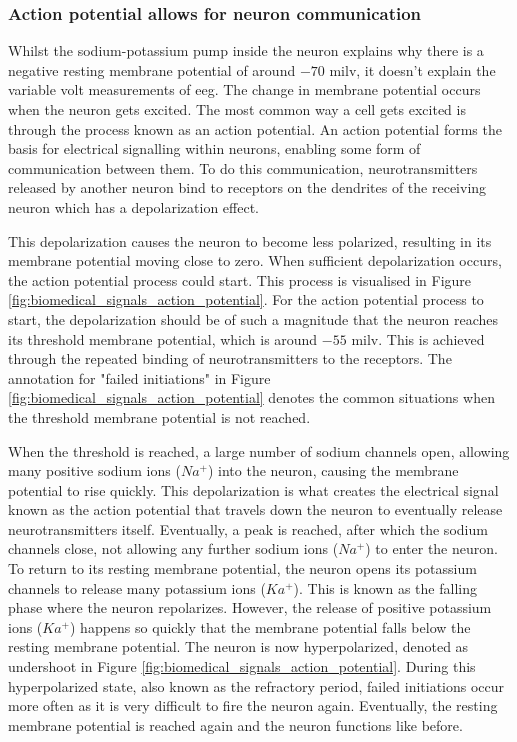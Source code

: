 \subsubsection{Action potential allows for neuron communication}
\label{subsubsec:biomedical_signals_biosignals_electrical_action_potential}

Whilst the sodium-potassium pump inside the neuron explains why there is a negative resting membrane potential of around $-70$ \gls{milv}, it doesn't explain the variable volt measurements of \gls{eeg}.
The change in membrane potential occurs when the neuron gets excited.
The most common way a cell gets excited is through the process known as an action potential.
An action potential forms the basis for electrical signalling within neurons, enabling some form of communication between them.
To do this communication, neurotransmitters released by another neuron bind to receptors on the dendrites of the receiving neuron which has a depolarization effect.

This depolarization causes the neuron to become less polarized, resulting in its membrane potential moving close to zero.
When sufficient depolarization occurs, the action potential process could start.
This process is visualised in Figure \ref{fig:biomedical_signals_action_potential}.
For the action potential process to start, the depolarization should be of such a magnitude that the neuron reaches its threshold membrane potential, which is around $-55$ \gls{milv}.
This is achieved through the repeated binding of neurotransmitters to the receptors.
The annotation for "failed initiations" in Figure \ref{fig:biomedical_signals_action_potential} denotes the common situations when the threshold membrane potential is not reached.

When the threshold is reached, a large number of sodium channels open, allowing many positive sodium ions ($Na^+$) into the neuron, causing the membrane potential to rise quickly.
This depolarization is what creates the electrical signal known as the action potential that travels down the neuron to eventually release neurotransmitters itself.
Eventually, a peak is reached, after which the sodium channels close, not allowing any further sodium ions ($Na^+$) to enter the neuron.
To return to its resting membrane potential, the neuron opens its potassium channels to release many potassium ions ($Ka^+$).
This is known as the falling phase where the neuron repolarizes.
However, the release of positive potassium ions ($Ka^+$) happens so quickly that the membrane potential falls below the resting membrane potential.
The neuron is now hyperpolarized, denoted as undershoot in Figure \ref{fig:biomedical_signals_action_potential}.
During this hyperpolarized state, also known as the refractory period, failed initiations occur more often as it is very difficult to fire the neuron again.
Eventually, the resting membrane potential is reached again and the neuron functions like before.


